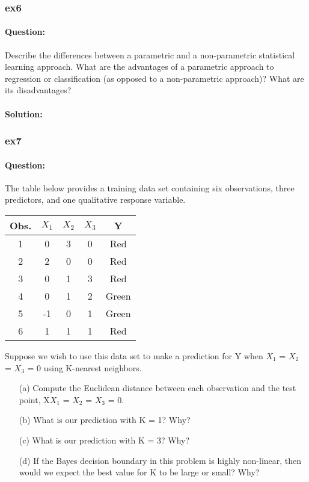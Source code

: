 \documentclass[a4paper,12pt,titlepage]{article} %
\begin{document}
\subsubsection{ex6}
\paragraph{Question:} Describe the differences between a parametric and a non-parametric statistical learning approach. What are the advantages of a parametric approach to regression or classification (as opposed to a non-parametric approach)? What are its disadvantages?

\paragraph{Solution:}

\subsubsection{ex7}
\paragraph{Question:} The table below provides a training data set containing six observations, three predictors, and one qualitative response variable.

\begin{center}
	\begin{tabular}{c|cccc}
		\hline
		Obs.& $X_{1}$ & $X_{2}$ & $X_{3}$ & Y \\
		\hline
		1 & 0 & 3 & 0 & Red \\
		2 & 2 & 0 & 0 & Red \\
		3 & 0 & 1 & 3 & Red \\
		4 & 0 & 1 & 2 & Green \\
		5 & -1 & 0 & 1 & Green \\
		6 & 1 & 1 & 1 & Red \\
		\hline
	\end{tabular}
\end{center}

Suppose we wish to use this data set to make a prediction for Y when $X_{1}$ = $X_{2}$ = $X_{3}$ = 0 using K-nearest neighbors.

\begin{itemize}
	\item[(a)] Compute the Euclidean distance between each observation and the test point, X$X_{1}$ = $X_{2}$ = $X_{3}$ = 0.
	\item[(b)] What is our prediction with K = 1? Why?
	\item[(c)] What is our prediction with K = 3? Why?
	\item[(d)] If the Bayes decision boundary in this problem is highly non-linear, then would we expect the best value for K to be large or small? Why?
\end{itemize}
\end{document}
